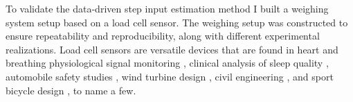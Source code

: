 To validate the data-driven step input estimation method I built a weighing system setup based on a load cell sensor.
The weighing setup was constructed to ensure repeatability and reproducibility, along with different experimental realizations.
Load cell sensors are versatile devices that are found in 
heart and breathing physiological signal monitoring \citep{Lee16},
clinical analysis of sleep quality \citep{Zahradka18},
automobile safety studies \citep{Ballo16},
wind turbine design \citep{Rossander15}, 
civil engineering \citep{Olmi16}, and 
sport bicycle design \citep{Casas16}, to name a few.


\begin{comment}
Weighing has been basic for the development of scientific and trade activites. 
The load cell is now a standard transducer for weight determination and also for the improvement of measurement techniques, such as the geometric approach to processing of load cell responses \citep{Kesilmis16}, the design of new conveyor machinery \citep{Yamani18}, and electronic truck scales \citep{Guo18}.

In safety studies, a six axis load cell is devised to quantify accelerations and impact forces exerted on a dummy \citep{Ballo16}.
In alternative energy developments the load cells are useful to measure the forces on the arms of a vertical axis wind turbine \citep{Rossander15}.
An academic study of the load that a structure withstands is conducted with strain gage load cells that confirms the numerical results and facilitates the design of complex shaped structures \citep{Olmi16}.
In sports, the performance of new instrumented crank mechanisms is fostered by the utilization of load cells in the characterization, analysis and validation design stages \citep{Casas16}.

The versatility of the load cells permits the physiological signal monitoring of the the heart and breathing rates \citep{Lee16}, clinical analysis of sleep quality \citep{Zahradka18} and the classification of the movement intensity of people while they are sleeping \citep{Alaziz17}. 
All of these experimental studies have load cells installed on bed setups.


%
An extension of the methodology proposed for the data-driven step input estimation was formulated to estimate the parameters of an affine input that changes at a constant rate,  by signal processing of the sensor transient response.
This type of ramp inputs is observed in the measurement of mass during the transportation of products on conveyor systems, ranging from few grams \citep{Burmen09} to almost hundreds of kilograms \citep{Tasaki07}.
The data-driven affine input estimation method is proposed as an alternative to existing compensation filters, such as 
the time-variant low-pass filters introduced in \citep{Piskorowski08, Pietrzak14}, and
the combination of filters in cascade proposed in \citep{Niedzwiecki16a}.
\end{comment}


